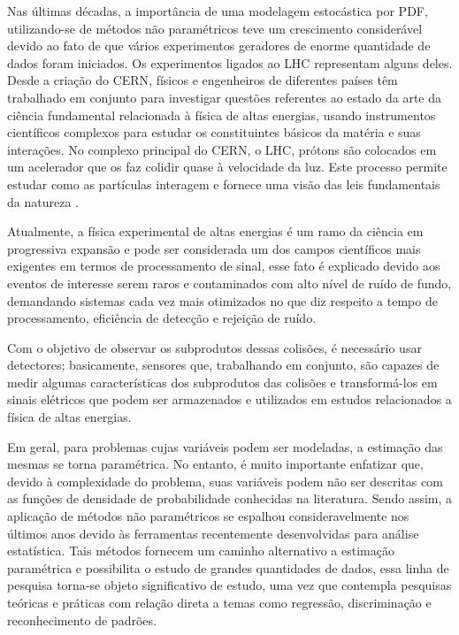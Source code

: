 Nas últimas décadas, a importância de uma modelagem estocástica por \ac{PDF}, utilizando-se de métodos não paramétricos teve um crescimento considerável devido ao fato de que vários experimentos geradores de enorme quantidade de dados foram iniciados.  Os experimentos ligados ao \ac{LHC} representam alguns deles. Desde a criação do \ac{CERN}, físicos e engenheiros de diferentes países têm trabalhado em conjunto para investigar questões referentes ao estado da arte da ciência fundamental relacionada à física de altas energias, usando instrumentos científicos complexos para estudar os constituintes básicos da matéria e suas interações. No complexo principal do \ac{CERN}, o \ac{LHC}, prótons são colocados em um acelerador que os faz colidir quase à velocidade da luz. Este processo permite estudar como as partículas interagem e fornece uma visão das leis fundamentais da natureza \cite{cernwebabout}.


Atualmente, a física experimental de altas energias é um ramo da ciência em progressiva expansão e pode ser considerada um dos campos científicos mais exigentes em termos de processamento de sinal, esse fato é explicado devido aos eventos de interesse serem raros e contaminados com alto nível de ruído de fundo, demandando sistemas cada vez mais otimizados no que diz respeito a tempo de processamento, eficiência de detecção e rejeição de ruído.

Com o objetivo de observar os subprodutos dessas colisões, é necessário usar detectores; basicamente, sensores que, trabalhando em conjunto, são capazes de medir algumas características dos subprodutos das colisões e transformá-los em sinais elétricos que podem ser armazenados e utilizados em estudos relacionados a física de altas energias.

Em geral, para problemas cujas variáveis podem ser modeladas, a estimação das mesmas se torna paramétrica. No entanto, é muito importante enfatizar que, devido à complexidade do problema, suas variáveis podem não ser descritas com as funções de densidade de probabilidade conhecidas na literatura. Sendo assim, a aplicação de métodos não paramétricos se espalhou consideravelmente nos últimos anos devido às ferramentas recentemente desenvolvidas para análise estatística. Tais métodos  fornecem um caminho alternativo a estimação paramétrica e possibilita o estudo de grandes quantidades de dados, essa linha de pesquisa torna-se objeto significativo de estudo, uma vez que contempla pesquisas teóricas e práticas com relação direta a temas como regressão, discriminação e reconhecimento de padrões. 

